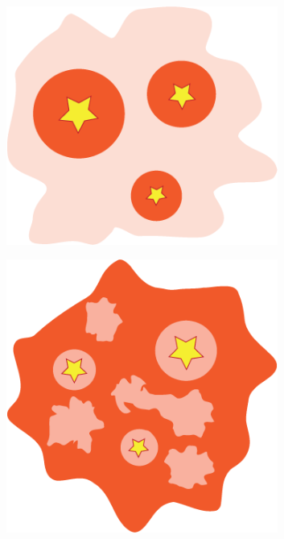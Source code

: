 \begin{figure}[ht!]
\begin{center}
\begin{subfigure}[b]{0.3\textwidth}
\centering
\includegraphics[width=0.98\textwidth]{Figures/CC.png} 
\caption{}
\label{subfig:scenarios:a}
\end{subfigure}
\begin{subfigure}[b]{0.3\textwidth}
\centering
\includegraphics[width=0.98\textwidth]{Figures/CA.png} 

\end{subfigure}
\end{center}
\end{figure}
